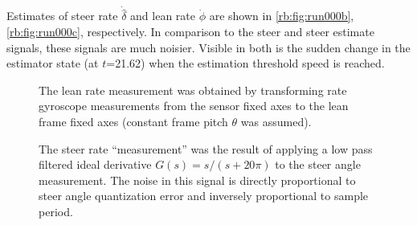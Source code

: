 Estimates of steer rate $\dot{\hat{\delta}}$ and lean rate $\dot{\phi}$ are
shown in \autoref{rb:fig:run000b}, \autoref{rb:fig:run000c}, respectively. In
comparison to the steer and steer estimate signals, these signals are much
noisier. Visible in both is the sudden change in the estimator state (at
$t$=21.62) when the estimation threshold speed is reached.

\begin{figure}[htbp]
  \centering
  \caption[Run 000 lean rate measured and estimated.]{The lean rate measurement
  was obtained by transforming rate gyroscope measurements from the sensor
  fixed axes to the lean frame fixed axes (constant frame pitch $\theta$ was
  assumed).}
  \label{rb:fig:run000b}
\end{figure}
\begin{figure}[htbp]
  \centering
  \caption[Run 000 steer rate measured and estimated.]{The steer rate
    ``measurement'' was the result of applying a low pass filtered ideal
    derivative $G(s) = s/(s+20\pi)$ to the steer angle measurement. The noise
    in this signal is directly proportional to steer angle quantization error
    and inversely proportional to sample period.}
  \label{rb:fig:run000c}
\end{figure}

